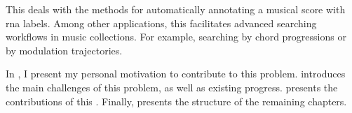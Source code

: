 

This \thesisdiss{} deals with the methods for automatically
annotating a musical score with \gls{rna}
labels. Among other applications, this facilitates advanced
searching workflows in music collections. For example,
searching by chord progressions or by modulation
trajectories.

In , I present my personal motivation to
contribute to this problem.  introduces
the main challenges of this problem, as well as existing
progress.  presents the
contributions of this \thesisdiss{}. Finally,
 presents the structure of the
remaining chapters.
